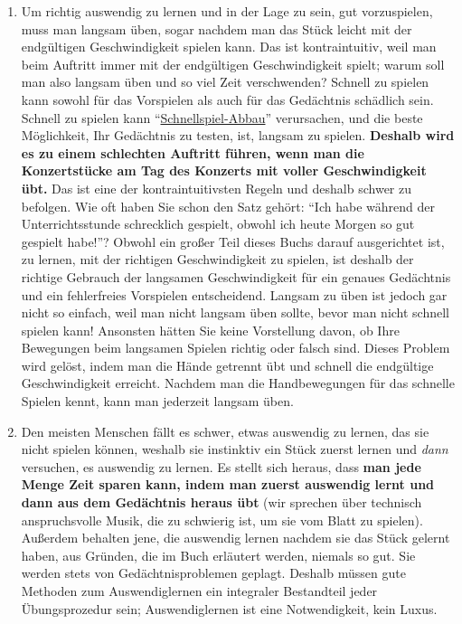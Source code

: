 \begin{enumerate}[label={\arabic*.}]
\item Um richtig auswendig zu lernen und in der Lage zu sein, gut vorzuspielen, muss man langsam üben, sogar nachdem man das Stück leicht mit der endgültigen Geschwindigkeit spielen kann.
Das ist kontraintuitiv, weil man beim Auftritt immer mit der endgültigen Geschwindigkeit spielt; warum soll man also langsam üben und so viel Zeit verschwenden?
Schnell zu spielen kann sowohl für das Vorspielen als auch für das Gedächtnis schädlich sein.
Schnell zu spielen kann \enquote{\hyperref[fpd]{Schnellspiel-Abbau}} verursachen, und die beste Möglichkeit, Ihr Gedächtnis zu testen, ist, langsam zu spielen.
\textbf{Deshalb wird es zu einem schlechten Auftritt führen, wenn man die Konzertstücke am Tag des Konzerts mit voller Geschwindigkeit übt.}
Das ist eine der kontraintuitivsten Regeln und deshalb schwer zu befolgen.
Wie oft haben Sie schon den Satz gehört: \enquote{Ich habe während der Unterrichtsstunde schrecklich gespielt, obwohl ich heute Morgen so gut gespielt habe!}?
Obwohl ein großer Teil dieses Buchs darauf ausgerichtet ist, zu lernen, mit der richtigen Geschwindigkeit zu spielen, ist deshalb der richtige Gebrauch der langsamen Geschwindigkeit für ein genaues Gedächtnis und ein fehlerfreies Vorspielen entscheidend.
Langsam zu üben ist jedoch gar nicht so einfach, weil man nicht langsam üben sollte, bevor man nicht schnell spielen kann!
Ansonsten hätten Sie keine Vorstellung davon, ob Ihre Bewegungen beim langsamen Spielen richtig oder falsch sind.
Dieses Problem wird gelöst, indem man die Hände getrennt übt und schnell die endgültige Geschwindigkeit erreicht.
Nachdem man die Handbewegungen für das schnelle Spielen kennt, kann man jederzeit langsam üben.

\item Den meisten Menschen fällt es schwer, etwas auswendig zu lernen, das sie nicht spielen können, weshalb sie instinktiv ein Stück zuerst lernen und \textit{dann} versuchen, es auswendig zu lernen.
Es stellt sich heraus, dass \textbf{man jede Menge Zeit sparen kann, indem man zuerst auswendig lernt und dann aus dem Gedächtnis heraus übt} (wir sprechen über technisch anspruchsvolle Musik, die zu schwierig ist, um sie vom Blatt zu spielen).
Außerdem behalten jene, die auswendig lernen nachdem sie das Stück gelernt haben, aus Gründen, die im Buch erläutert werden, niemals so gut.
Sie werden stets von Gedächtnisproblemen geplagt.
Deshalb müssen gute Methoden zum Auswendiglernen ein integraler Bestandteil jeder Übungsprozedur sein; Auswendiglernen ist eine Notwendigkeit, kein Luxus.
\end{enumerate}

